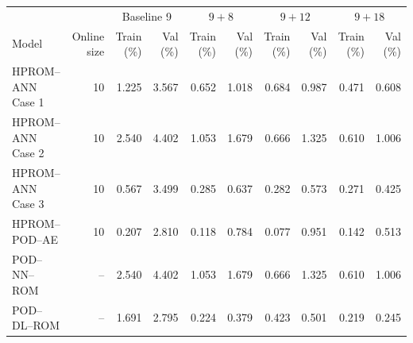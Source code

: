 \begin{tabular}{lr|rr|rr|rr|rr}
\toprule
\multicolumn{2}{c|}{} & \multicolumn{2}{c|}{Baseline 9} & \multicolumn{2}{c|}{$9+8$} & \multicolumn{2}{c|}{$9+12$} & \multicolumn{2}{c}{$9+18$} \\ Model & Online size & Train (\%) & Val (\%) & Train (\%) & Val (\%) & Train (\%) & Val (\%) & Train (\%) & Val (\%) \\
\midrule
HPROM--ANN Case 1 & 10 & 1.225 & 3.567 & 0.652 & 1.018 & 0.684 & 0.987 & 0.471 & 0.608 \\
HPROM--ANN Case 2 & 10 & 2.540 & 4.402 & 1.053 & 1.679 & 0.666 & 1.325 & 0.610 & 1.006 \\
HPROM--ANN Case 3 & 10 & 0.567 & 3.499 & 0.285 & 0.637 & 0.282 & 0.573 & 0.271 & 0.425 \\
HPROM--POD--AE & 10 & 0.207 & 2.810 & 0.118 & 0.784 & 0.077 & 0.951 & 0.142 & 0.513 \\
\midrule
POD--NN--ROM & -- & 2.540 & 4.402 & 1.053 & 1.679 & 0.666 & 1.325 & 0.610 & 1.006 \\
POD--DL--ROM & -- & 1.691 & 2.795 & 0.224 & 0.379 & 0.423 & 0.501 & 0.219 & 0.245 \\
\bottomrule
\end{tabular}
